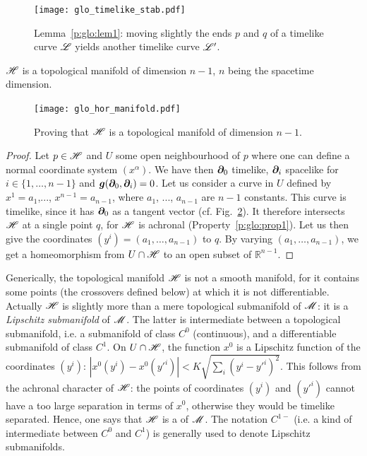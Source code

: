 \begin{figure}
\centerline{\texttt{[image: glo\_timelike\_stab.pdf]}}
\caption[]{\label{f:glo:timelike_stab} \footnotesize
Lemma~\ref{p:glo:lem1}: moving slightly the ends $p$ and $q$ of a timelike curve $\mathscr{L}$
yields another timelike curve $\mathscr{L}'$.}
\end{figure}


\begin{prop}
\label{p:glo:prop2}
$\mathscr{H}$ is a topological manifold of dimension $n-1$, $n$ being the spacetime
dimension.
\end{prop}

\begin{figure}
\centerline{\texttt{[image: glo\_hor\_manifold.pdf]}}
\caption[]{\label{f:glo:hor_manifold} \footnotesize
Proving that $\mathscr{H}$ is a topological manifold of dimension $n-1$.}
\end{figure}

\begin{proof}
Let $p\in\mathscr{H}$ and $U$ some open neighbourhood of $p$ where one can define
a normal coordinate system $(x^\alpha)$. We have then $\bm{\partial}_0$ timelike,
$\bm{\partial}_i$ spacelike for $i\in\{1,\ldots,n-1\}$ and $\bm{g}(\bm{\partial}_0, \bm{\partial}_i) = 0$.
Let us consider a curve in $U$ defined by $x^1 = a_1$,..., $x^{n-1} = a_{n-1}$,
where $a_1$, ..., $a_{n-1}$ are $n-1$ constants.
This curve is timelike, since it has $\bm{\partial}_0$ as a tangent vector
(cf. Fig.~\ref{f:glo:hor_manifold}).
It therefore intersects $\mathscr{H}$ at a single point $q$, for $\mathscr{H}$ is achronal
(Property~\ref{p:glo:prop1}).
Let us then give the coordinates $(y^i) = (a_1,\ldots,a_{n-1})$ to $q$.
By varying $(a_1,\ldots,a_{n-1})$, we get a homeomorphism from $U\cap\mathscr{H}$
to an open subset of $\mathbb{R}^{n-1}$.
\end{proof}

\begin{remark}
Generically, the topological manifold $\mathscr{H}$ is not a smooth manifold, for it
contains some points (the crossovers defined below) at which it is not differentiable.
Actually $\mathscr{H}$ is slightly more than a mere topological submanifold of $\mathscr{M}$: it is a
\emph{Lipschitz submanifold} of $\mathscr{M}$. The latter is
intermediate between a topological submanifold, i.e.
a submanifold of class $C^0$ (continuous), and a differentiable submanifold of
class $C^1$. On $U\cap\mathscr{H}$, the function $x^0$ is a Lipschitz function
of the coordinates $(y^i)$: $\left|x^0(y^i) - x^0({y'}^i)\right| < K \sqrt{\sum_i (y^i - {y'}^i)^2}$.
This follows from the achronal character of $\mathscr{H}$: the points of coordinates
$(y^i)$ and $({y'}^i)$ cannot have a too large separation in terms of $x^0$,
otherwise they would be timelike separated.
Hence, one says that $\mathscr{H}$ is a  of $\mathscr{M}$. The notation $C^{1-}$ (i.e. a kind of intermediate between
$C^0$ and $C^1$) is generally used to denote Lipschitz submanifolds.
\end{remark}

